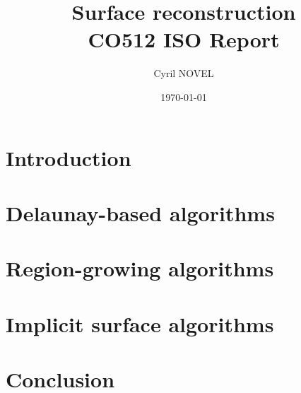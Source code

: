 \documentclass[a4paper]{article}
\title{Surface reconstruction\\
\large{CO512 ISO Report}}
\author{Cyril NOVEL}
\date{\today}
\begin{document}
\maketitle
\newpage

\section{Introduction}

\section{Delaunay-based algorithms}

\section{Region-growing algorithms}

\section{Implicit surface algorithms}

\section{Conclusion}
\end{document}
